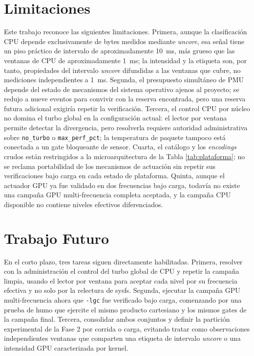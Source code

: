 \documentclass[12pt,oneside,spanish]{book}
\begin{document}
\section{Limitaciones}

Este trabajo reconoce las siguientes limitaciones. Primera, aunque la clasificación CPU depende exclusivamente de bytes medidos mediante \textit{uncore}, esa señal tiene un piso práctico de intervalo de aproximadamente 10~ms, más grueso que las ventanas de CPU de aproximadamente 1~ms; la intensidad y la etiqueta son, por tanto, propiedades del intervalo \textit{uncore} difundidas a las ventanas que cubre, no mediciones independientes a 1~ms. Segunda, el presupuesto simultáneo de PMU depende del estado de mecanismos del sistema operativo ajenos al proyecto; se redujo a nueve eventos para convivir con la reserva encontrada, pero una reserva futura adicional exigiría repetir la verificación. Tercera, el control CPU por núcleo no domina el turbo global en la configuración actual: el lector por ventana permite detectar la divergencia, pero resolverla requiere autoridad administrativa sobre \texttt{no\_turbo} o \texttt{max\_perf\_pct}; la temperatura de paquete tampoco está conectada a un gate bloqueante de sensor. Cuarta, el catálogo y los \textit{encodings} crudos están restringidos a la microarquitectura de la Tabla \ref{tab:plataforma}; no se reclama portabilidad de los mecanismos de actuación sin repetir sus verificaciones bajo carga en cada estado de plataforma. Quinta, aunque el actuador GPU ya fue validado en dos frecuencias bajo carga, todavía no existe una campaña GPU multi-frecuencia completa aceptada, y la campaña CPU disponible no contiene niveles efectivos diferenciados.

\section{Trabajo Futuro}

En el corto plazo, tres tareas siguen directamente habilitadas. Primera, resolver con la administración el control del turbo global de CPU y repetir la campaña limpia, usando el lector por ventana para aceptar cada nivel por su frecuencia efectiva y no solo por la relectura de sysfs. Segunda, ejecutar la campaña GPU multi-frecuencia ahora que \texttt{-lgc} fue verificado bajo carga, comenzando por una prueba de humo que ejercite el mismo producto cartesiano y los mismos gates de la campaña final. Tercera, consolidar ambos conjuntos y definir la partición experimental de la Fase 2 por corrida o carga, evitando tratar como observaciones independientes ventanas que comparten una etiqueta de intervalo \textit{uncore} o una intensidad GPU caracterizada por kernel.
\end{document}
